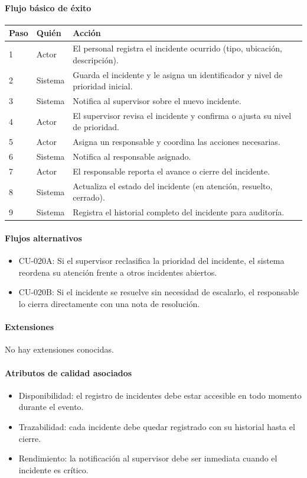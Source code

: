 \paragraph{Flujo básico de éxito}
\begin{longtable}{P{1.1cm}P{1.8cm}P{10.5cm}}
\toprule
\textbf{Paso} & \textbf{Quién} & \textbf{Acción}\\
\midrule
{} & Actor & El personal registra el incidente ocurrido (tipo, ubicación, descripción).\\
2 & Sistema & Guarda el incidente y le asigna un identificador y nivel de prioridad inicial.\\
3 & Sistema & Notifica al supervisor sobre el nuevo incidente.\\
4 & Actor & El supervisor revisa el incidente y confirma o ajusta su nivel de prioridad.\\
5 & Actor & Asigna un responsable y coordina las acciones necesarias.\\
6 & Sistema & Notifica al responsable asignado.\\
7 & Actor & El responsable reporta el avance o cierre del incidente.\\
8 & Sistema & Actualiza el estado del incidente (en atención, resuelto, cerrado).\\
9 & Sistema & Registra el historial completo del incidente para auditoría.\\
\bottomrule
\end{longtable}

\paragraph{Flujos alternativos}
\begin{itemize}[leftmargin=1.4em, topsep=1pt]
  \item CU-020A: Si el supervisor reclasifica la prioridad del incidente, el sistema reordena su atención frente a otros incidentes abiertos.
  \item CU-020B: Si el incidente se resuelve sin necesidad de escalarlo, el responsable lo cierra directamente con una nota de resolución.
\end{itemize}

\paragraph{Extensiones}
No hay extensiones conocidas.

\paragraph{Atributos de calidad asociados}
\begin{itemize}[leftmargin=1.4em, topsep=1pt]
  \item Disponibilidad: el registro de incidentes debe estar accesible en todo momento durante el evento.
  \item Trazabilidad: cada incidente debe quedar registrado con su historial hasta el cierre.
  \item Rendimiento: la notificación al supervisor debe ser inmediata cuando el incidente es crítico.
\end{itemize}

